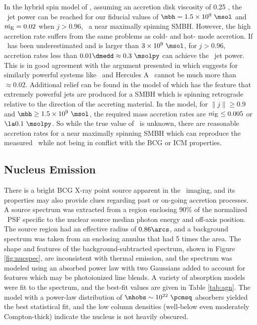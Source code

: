 \documentclass[iop]{emulateapj-rtx4}
\begin{document}
In the hybrid spin model of \citet{2007MNRAS.377.1652N}, assuming an
accretion disk viscosity of 0.25 \citep{1999ApJ...520..298Q}, the
\rbs\ jet power can be reached for our fiducial values of $\mbh = 1.5
\times 10^9 ~\msol$ and $\dot{m_{\rm{E}}} = 0.02$ when $j > 0.96$, \ie\ a near
maximally spinning SMBH. However, the high accretion rate suffers from
the same problems as cold- and hot- mode accretion. If \mbh\ has been
underestimated and is larger than $3 \times 10^9 ~\msol$, for $j >
0.96$, accretion rates less than $0.01 \dmedd \approx 0.3 ~\msolpy$
can achieve the \rbs\ jet power. This is in good agreement with the
argument presented in \citet{minaspin} which suggests for similarly
powerful systems like \ms\ and Hercules A \dme\ cannot be much more
than $\approx 0.02$. Additional relief can be found in the model of
\citet{gesspin} which has the feature that extremely powerful jets are
produced for a SMBH which is spinning retrograde relative to the
direction of the accreting material. In the \citet{gesspin} model, for
$\|j\| \ge 0.9$ and $\mbh \ge 1.5 \times 10^9 ~\msol$, the required
mass accretion rates are $\dot{m_{\rm{E}}} \le 0.005$ or $\la 0.1 ~\msolpy$. So
while the true value of \dme\ is unknown, there are reasonable
accretion rates for a near maximally spinning SMBH which can reproduce
the measured \pjet\ while not being in conflict with the BCG or ICM
properties.

\subsection{Nucleus Emission}
\label{sec:nuc}

There is a bright BCG X-ray point source apparent in the
\cxo\ imaging, and its properties may also provide clues regarding
past or on-going accretion processes. A source spectrum was extracted
from a region enclosing 90\% of the normalized \cxo\ PSF specific to
the nuclear source median photon energy and off-axis position. The
source region had an effective radius of $0.86\arcs$, and a background
spectrum was taken from an enclosing annulus that had 5 times the
area. The shape and features of the background-subtracted spectrum,
shown in Figure \ref{fig:nucspec}, are inconsistent with thermal
emission, and the spectrum was modeled using an absorbed power law
with two Gaussians added to account for features which may be
photoionized line blends. A variety of absorption models were fit to
the spectrum, and the best-fit values are given in Table
\ref{tab:agn}. The model with a power-law distribution of $\nhobs \sim
10^{22} ~\pcmsq$ absorbers yielded the best statistical fit, and the
low column densities (well-below even moderately Compton-thick)
indicate the nucleus is not heavily obscured.
\end{document}
